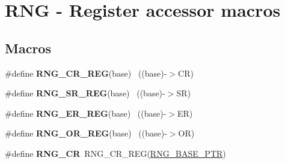 \hypertarget{group___r_n_g___register___accessor___macros}{}\section{R\+N\+G -\/ Register accessor macros}
\label{group___r_n_g___register___accessor___macros}
\subsection*{Macros}
\begin{DoxyCompactItemize}
\item 
\hypertarget{group___r_n_g___register___accessor___macros_gaf431279cf190ea4f0aa78163eca94ba7}{}\#define {\bfseries R\+N\+G\+\_\+\+C\+R\+\_\+\+R\+E\+G}(base)                                              ~((base)-\/$>$C\+R)\label{group___r_n_g___register___accessor___macros_gaf431279cf190ea4f0aa78163eca94ba7}

\item 
\hypertarget{group___r_n_g___register___accessor___macros_gaf71f3a6c22bd37aad985b4edeefdfbd6}{}\#define {\bfseries R\+N\+G\+\_\+\+S\+R\+\_\+\+R\+E\+G}(base)                                              ~((base)-\/$>$S\+R)\label{group___r_n_g___register___accessor___macros_gaf71f3a6c22bd37aad985b4edeefdfbd6}

\item 
\hypertarget{group___r_n_g___register___accessor___macros_ga31375357eddbd10aab981d349432cdde}{}\#define {\bfseries R\+N\+G\+\_\+\+E\+R\+\_\+\+R\+E\+G}(base)                                              ~((base)-\/$>$E\+R)\label{group___r_n_g___register___accessor___macros_ga31375357eddbd10aab981d349432cdde}

\item 
\hypertarget{group___r_n_g___register___accessor___macros_gaa10d3a9ce7085fb6d7c9c77bd5f35340}{}\#define {\bfseries R\+N\+G\+\_\+\+O\+R\+\_\+\+R\+E\+G}(base)                                              ~((base)-\/$>$O\+R)\label{group___r_n_g___register___accessor___macros_gaa10d3a9ce7085fb6d7c9c77bd5f35340}

\item 
\hypertarget{group___r_n_g___register___accessor___macros_ga9f983dd60cadb7f93a7cbc3242bed807}{}\#define {\bfseries R\+N\+G\+\_\+\+C\+R}~R\+N\+G\+\_\+\+C\+R\+\_\+\+R\+E\+G(\hyperlink{group___r_n_g___peripheral_ga799f35e89514a95969257046b5dab042}{R\+N\+G\+\_\+\+B\+A\+S\+E\+\_\+\+P\+T\+R})\label{group___r_n_g___register___accessor___macros_ga9f983dd60cadb7f93a7cbc3242bed807}


\end{DoxyCompactItemize}

